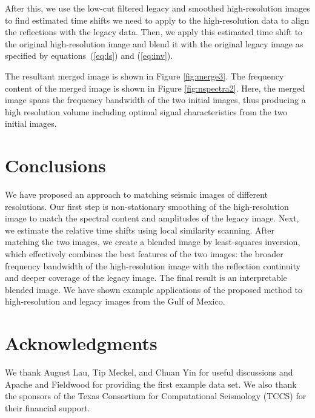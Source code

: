 After this, we use the low-cut filtered legacy and smoothed high-resolution images to find estimated time shifts we need to apply to the high-resolution data to align the reflections with the legacy data. Then, we apply this estimated time shift to the original high-resolution image and blend it with the original legacy image as specified by equations~(\ref{eq:ls}) and (\ref{eq:inv}).

The resultant merged image is shown in Figure \ref{fig:merge3}. The frequency content of the merged image is shown in Figure 
\ref{fig:nspectra2}. Here, the merged image spans the frequency bandwidth of the two initial images, thus producing a high resolution volume including optimal signal characteristics from the two initial images.






\section{Conclusions}

We have proposed an approach to matching seismic images of different
resolutions. Our first step is non-stationary smoothing of the
high-resolution image to match the spectral content and amplitudes
of the legacy image. Next, we estimate the relative time shifts using
local similarity scanning. After matching the two images, we create a
blended image by least-squares inversion, which effectively
combines the best features of the two images: the broader frequency
bandwidth of the high-resolution image with the reflection continuity
and deeper coverage of the legacy image. The final result is an 
interpretable blended image. We have shown example applications of
the proposed method to high-resolution and legacy images from the Gulf
of Mexico.

\section{Acknowledgments}

We thank August Lau, Tip Meckel, and Chuan Yin for useful discussions and Apache and Fieldwood for providing the first example data set. 
We also thank the sponsors of the Texas Consortium for Computational Seismology (TCCS) for their financial support. 

\onecolumn


